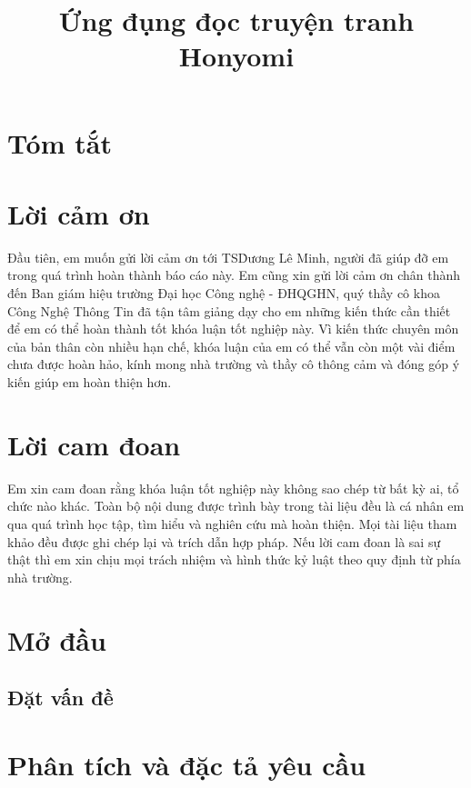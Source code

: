 \documentclass{report}
\title{Ứng đụng đọc truyện tranh Honyomi}
\begin{document}

\clearpage{}

\chapter*{Tóm tắt}

\chapter*{Lời cảm ơn}

Đầu tiên, em muốn gửi lời cảm ơn tới TS\. Dương Lê Minh, người đã giúp đỡ em trong quá trình hoàn thành báo cáo này.
Em cũng xin gửi lời cảm ơn chân thành đến Ban giám hiệu trường Đại học Công nghệ - ĐHQGHN, quý thầy cô khoa Công Nghệ Thông Tin đã tận tâm giảng dạy cho em những kiến thức cần thiết để em có thể hoàn thành tốt khóa luận tốt nghiệp này.
Vì kiến thức chuyên môn của bản thân còn nhiều hạn chế, khóa luận của em có thể vẫn còn một vài điểm chưa được hoàn hảo, kính mong nhà trường và thầy cô thông cảm và đóng góp ý kiến giúp em hoàn thiện hơn.

\chapter*{Lời cam đoan}

Em xin cam đoan rằng khóa luận tốt nghiệp này không sao chép từ bất kỳ ai, tổ chức nào khác. Toàn bộ nội dung được trình bày trong tài liệu đều là cá nhân em qua quá trình học tập, tìm hiểu và nghiên cứu mà hoàn thiện. Mọi tài liệu tham khảo đều được ghi chép lại và trích dẫn hợp pháp. Nếu lời cam đoan là sai sự thật thì em xin chịu mọi trách nhiệm và hình thức kỷ luật theo quy định từ phía nhà trường.

\tableofcontents{}
\clearpage{}

\listoffigures{}

\listoftables{}

\chapter{Mở đầu}

\section{Đặt vấn đề}


\chapter{Phân tích và đặc tả yêu cầu}
\end{document}
